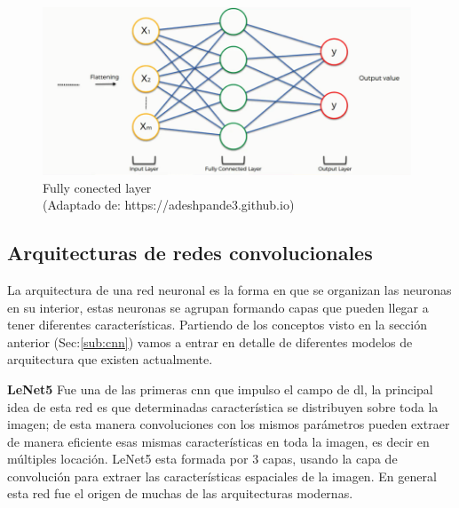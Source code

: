 \begin{figure}[H]
 \centering
  \includegraphics[height=5cm,keepaspectratio=true,clip=true]{imagenes/MarcoTeorico/fully_conected.png}
  \caption{Fully conected layer \\ (Adaptado de: https://adeshpande3.github.io)} \label{Fig:fully_conected}
\end{figure}




\subsection{Arquitecturas de redes convolucionales}\label{sub:arquitecturacnn}
La arquitectura de una red neuronal es la forma en que se organizan  las neuronas en su interior, estas neuronas se agrupan formando capas que pueden llegar a tener diferentes características. Partiendo de los conceptos visto en la sección anterior (Sec:\ref{sub:cnn}) vamos a entrar en detalle de diferentes modelos de arquitectura que existen actualmente.

\par \textbf{LeNet5} \citep{lenet} Fue una de las primeras \ac{cnn} que impulso el campo de \ac{dl}, la principal idea de esta red es que determinadas característica se distribuyen sobre toda la imagen; de esta manera convoluciones con los mismos parámetros pueden extraer de manera eficiente esas mismas características en toda la imagen, es decir en múltiples locación. LeNet5 esta formada por 3 capas, usando la capa de convolución para extraer las características espaciales de la imagen. En general esta red fue el origen de muchas de las arquitecturas modernas.

